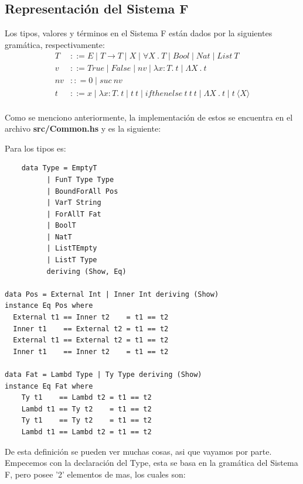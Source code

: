 \documentclass[12pt, titlepage, a4paper]{article}
\begin{document}
\subsection{Representación del Sistema F}
Los tipos, valores y términos en el Sistema F están dados por la siguientes gramática, respectivamente:
\begin{align*}
    T &::= E \mid T \rightarrow T \mid X \mid \forall X \ . \ T \mid Bool \mid Nat \mid List \ T\\
    v &::= True \mid False \mid nv \mid \lambda x:T. \ t \mid \Lambda X \ . \ t \\
    nv &:: = 0 \mid suc \ nv \\
    t &::= x \mid \lambda x:T. \ t \mid t \ t \mid ifthenelse \ t \ t \ t \mid \Lambda X \ . \ t \mid t \ \langle X \rangle \\
\end{align*}

Como se menciono anteriormente, la implementación de estos se encuentra en el archivo \textbf{src/Common.hs} y es la siguiente:

\noindent Para los tipos es:
\begin{verbatim}
    data Type = EmptyT 
          | FunT Type Type
          | BoundForAll Pos
          | VarT String
          | ForAllT Fat
          | BoolT
          | NatT
          | ListTEmpty
          | ListT Type
          deriving (Show, Eq)

data Pos = External Int | Inner Int deriving (Show)
instance Eq Pos where
  External t1 == Inner t2    = t1 == t2
  Inner t1    == External t2 = t1 == t2
  External t1 == External t2 = t1 == t2
  Inner t1    == Inner t2    = t1 == t2

data Fat = Lambd Type | Ty Type deriving (Show)
instance Eq Fat where
    Ty t1    == Lambd t2 = t1 == t2
    Lambd t1 == Ty t2    = t1 == t2
    Ty t1    == Ty t2    = t1 == t2
    Lambd t1 == Lambd t2 = t1 == t2
\end{verbatim}

De esta definición se pueden ver muchas cosas, asi que vayamos por parte. Empecemos con la declaración del Type, esta se basa en la gramática del Sistema F, pero 
posee '2' elementos de mas, los cuales son: 
\end{document}
